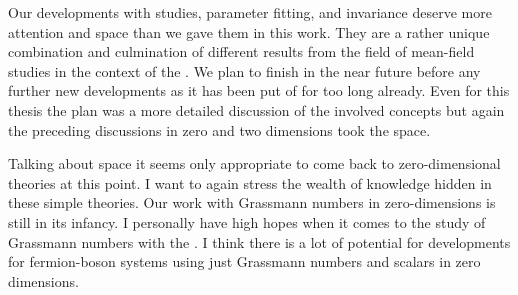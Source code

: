 Our developments with \rgct{} \mf{} studies, parameter fitting, and \Poincare{} invariance deserve more attention and space than we gave them in this work.
They are a rather unique combination and culmination of different results from the field of mean-field studies in the context of the \frg{}.
We plan to finish  in the near future before any further new developments as it has been put of for too long already.
Even for this thesis the plan was a more detailed discussion of the involved concepts but again the preceding discussions in zero and two dimensions took the space.\bigskip

Talking about space it seems only appropriate to come back to zero-dimensional theories at this point.
I want to again stress the wealth of knowledge hidden in these simple theories.
Our work with Grassmann numbers in zero-dimensions is still in its infancy. 
I personally have high hopes when it comes to the study of Grassmann numbers with the \frg{}. I think there is a lot of potential for developments for fermion-boson systems using just Grassmann numbers and scalars in zero dimensions.